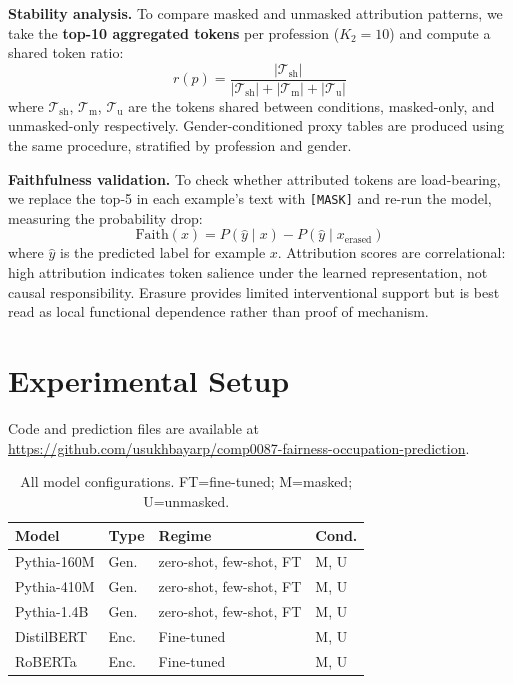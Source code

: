 \documentclass[11pt]{article}
\begin{document}
\textbf{Stability analysis.}
To compare masked and unmasked attribution patterns, we take the
\textbf{top-10 aggregated tokens} per profession ($K_2\!=\!10$) and
compute a shared token ratio:
\begin{equation}
  r(p) = \frac{|\mathcal{T}_\text{sh}|}{
    |\mathcal{T}_\text{sh}|+|\mathcal{T}_\text{m}|+|\mathcal{T}_\text{u}|}
\end{equation}
where $\mathcal{T}_\text{sh}$, $\mathcal{T}_\text{m}$,
$\mathcal{T}_\text{u}$ are the tokens shared between conditions,
masked-only, and unmasked-only respectively.
Gender-conditioned proxy tables are produced using the same procedure,
stratified by profession and gender.

\textbf{Faithfulness validation.}
To check whether attributed tokens are load-bearing, we replace the top-5 in each example's text with \texttt{[MASK]} and re-run the model, measuring the probability drop:
\begin{equation}
  \text{Faith}(x) = P(\hat{y} \mid x) - P(\hat{y} \mid x_{\text{erased}})
\end{equation}
where $\hat{y}$ is the predicted label for example $x$.
Attribution scores are correlational: high attribution indicates token
salience under the learned representation, not causal responsibility.
Erasure provides limited interventional support but is best read as
local functional dependence rather than proof of mechanism.

\section{Experimental Setup}

Code and prediction files are available at
\url{https://github.com/usukhbayarp/comp0087-fairness-occupation-prediction}.

\begin{table}[h]
\centering\small
\setlength{\tabcolsep}{4pt}
\begin{tabular}{llll}
\toprule
\textbf{Model} & \textbf{Type} & \textbf{Regime} & \textbf{Cond.} \\
\midrule
Pythia-160M & Gen. & zero-shot, few-shot, FT & M, U \\
Pythia-410M & Gen. & zero-shot, few-shot, FT & M, U \\
Pythia-1.4B & Gen. & zero-shot, few-shot, FT & M, U \\
DistilBERT  & Enc. & Fine-tuned              & M, U \\
RoBERTa     & Enc. & Fine-tuned              & M, U \\
\bottomrule
\end{tabular}
\caption{All model configurations. FT=fine-tuned; M=masked; U=unmasked.}
\label{tab:configs}
\end{table}
\end{document}
